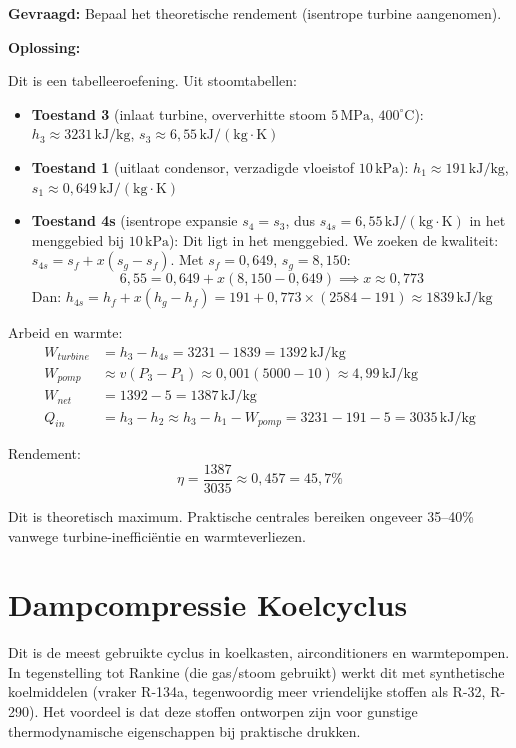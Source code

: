 \documentclass[a4paper,11pt,twoside]{report}
\begin{document}
\textbf{Gevraagd:} Bepaal het theoretische rendement (isentrope turbine aangenomen).

\textbf{Oplossing:}

Dit is een tabelleeroefening. Uit stoomtabellen:
\begin{itemize}
    \item \textbf{Toestand 3} (inlaat turbine, oververhitte stoom $5\,\mathrm{MPa}$, $400^\circ\mathrm{C}$): $h_3 \approx 3231\,\mathrm{kJ/kg}$, $s_3 \approx 6{,}55\,\mathrm{kJ/(kg \cdot K)}$
    
    \item \textbf{Toestand 1} (uitlaat condensor, verzadigde vloeistof $10\,\mathrm{kPa}$): $h_1 \approx 191\,\mathrm{kJ/kg}$, $s_1 \approx 0{,}649\,\mathrm{kJ/(kg \cdot K)}$
    
    \item \textbf{Toestand 4s} (isentrope expansie $s_4 = s_3$, dus $s_{4s} = 6{,}55\,\mathrm{kJ/(kg \cdot K)}$ in het menggebied bij $10\,\mathrm{kPa}$): Dit ligt in het menggebied. We zoeken de kwaliteit: $s_{4s} = s_f + x(s_g - s_f)$. Met $s_f = 0{,}649$, $s_g = 8{,}150$:
    \[
    6{,}55 = 0{,}649 + x(8{,}150 - 0{,}649) \implies x \approx 0{,}773
    \]
    Dan: $h_{4s} = h_f + x(h_g - h_f) = 191 + 0{,}773 \times (2584 - 191) \approx 1839\,\mathrm{kJ/kg}$
\end{itemize}

Arbeid en warmte:
\begin{align}
    W_{turbine} &= h_3 - h_{4s} = 3231 - 1839 = 1392\,\mathrm{kJ/kg}\\
    W_{pomp} &\approx v(P_3 - P_1) \approx 0{,}001(5000 - 10) \approx 4{,}99\,\mathrm{kJ/kg}\\
    W_{net} &= 1392 - 5 = 1387\,\mathrm{kJ/kg}\\
    Q_{in} &= h_3 - h_2 \approx h_3 - h_1 - W_{pomp} = 3231 - 191 - 5 = 3035\,\mathrm{kJ/kg}
\end{align}

Rendement:
\[
\eta = \frac{1387}{3035} \approx 0{,}457 = 45{,}7\%
\]

Dit is theoretisch maximum. Praktische centrales bereiken ongeveer 35–40\% vanwege turbine-inefficiëntie en warmteverliezen.

\section{Dampcompressie Koelcyclus}

Dit is de meest gebruikte cyclus in koelkasten, airconditioners en warmtepompen. In tegenstelling tot Rankine (die gas/stoom gebruikt) werkt dit met synthetische koelmiddelen (vraker R-134a, tegenwoordig meer vriendelijke stoffen als R-32, R-290). Het voordeel is dat deze stoffen ontworpen zijn voor gunstige thermodynamische eigenschappen bij praktische drukken.
\end{document}
